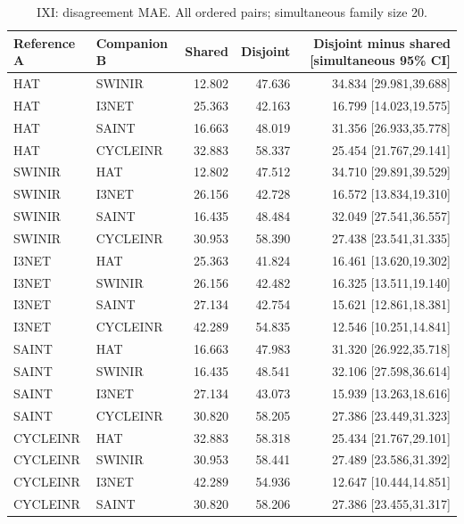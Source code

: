 \begin{table}[t]\centering\small
\caption{IXI: disagreement MAE. All ordered pairs; simultaneous family size 20.}
\begin{tabular}{llrrr}\toprule Reference A & Companion B & Shared & Disjoint & Disjoint minus shared [simultaneous 95\% CI]\\\midrule
HAT & SWINIR & 12.802 & 47.636 & 34.834 [29.981,39.688] \\
HAT & I3NET & 25.363 & 42.163 & 16.799 [14.023,19.575] \\
HAT & SAINT & 16.663 & 48.019 & 31.356 [26.933,35.778] \\
HAT & CYCLEINR & 32.883 & 58.337 & 25.454 [21.767,29.141] \\
SWINIR & HAT & 12.802 & 47.512 & 34.710 [29.891,39.529] \\
SWINIR & I3NET & 26.156 & 42.728 & 16.572 [13.834,19.310] \\
SWINIR & SAINT & 16.435 & 48.484 & 32.049 [27.541,36.557] \\
SWINIR & CYCLEINR & 30.953 & 58.390 & 27.438 [23.541,31.335] \\
I3NET & HAT & 25.363 & 41.824 & 16.461 [13.620,19.302] \\
I3NET & SWINIR & 26.156 & 42.482 & 16.325 [13.511,19.140] \\
I3NET & SAINT & 27.134 & 42.754 & 15.621 [12.861,18.381] \\
I3NET & CYCLEINR & 42.289 & 54.835 & 12.546 [10.251,14.841] \\
SAINT & HAT & 16.663 & 47.983 & 31.320 [26.922,35.718] \\
SAINT & SWINIR & 16.435 & 48.541 & 32.106 [27.598,36.614] \\
SAINT & I3NET & 27.134 & 43.073 & 15.939 [13.263,18.616] \\
SAINT & CYCLEINR & 30.820 & 58.205 & 27.386 [23.449,31.323] \\
CYCLEINR & HAT & 32.883 & 58.318 & 25.434 [21.767,29.101] \\
CYCLEINR & SWINIR & 30.953 & 58.441 & 27.489 [23.586,31.392] \\
CYCLEINR & I3NET & 42.289 & 54.936 & 12.647 [10.444,14.851] \\
CYCLEINR & SAINT & 30.820 & 58.206 & 27.386 [23.455,31.317] \\
\bottomrule\end{tabular}\end{table}
